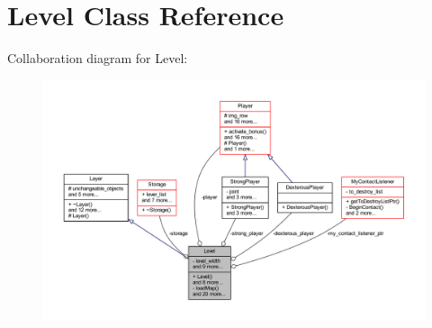 \hypertarget{class_level}{}\section{Level Class Reference}
\label{class_level}


Collaboration diagram for Level\+:\nopagebreak
\begin{figure}[H]
\begin{center}
\leavevmode
\includegraphics[width=350pt]{class_level__coll__graph}
\end{center}
\end{figure}
